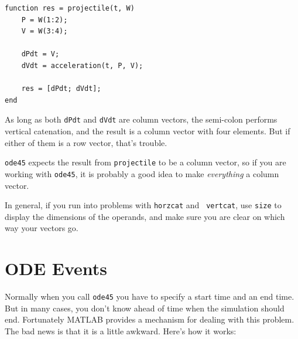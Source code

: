 \documentclass{book}
\begin{document}
\begin{verbatim}
function res = projectile(t, W)
    P = W(1:2);
    V = W(3:4);

    dPdt = V;                          
    dVdt = acceleration(t, P, V);

    res = [dPdt; dVdt];
end
\end{verbatim}

As long as both {\tt dPdt} and {\tt dVdt} are column vectors,
the semi-colon performs vertical catenation, and the result is
a column vector with four elements.  But if either of them is a
row vector, that's trouble.

{\tt ode45} expects the result from {\tt projectile} to be a
column vector, so if you are working with {\tt ode45}, it is
probably a good idea to make {\em everything} a column vector.

In general, if you run into problems with {\tt horzcat} and {\tt
vertcat}, use {\tt size} to display the dimensions of the operands,
and make sure you are clear on which way your vectors go.


\section{ODE Events}
\label{events}

Normally when you call {\tt ode45} you have to specify
a start time and an end time.  But in many cases, you don't know ahead
of time when the simulation should end.
Fortunately MATLAB provides a mechanism for dealing
with this problem.  The bad news is that it is a little awkward.
Here's how it works:
\end{document}
